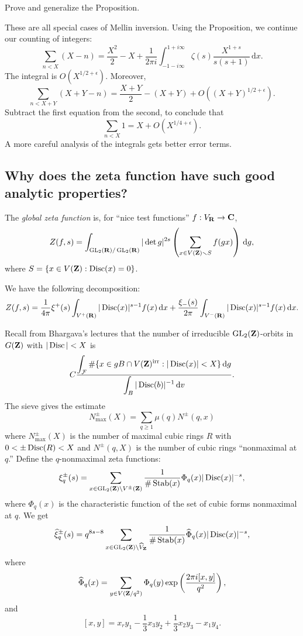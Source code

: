\begin{exercise}
Prove and generalize the Proposition. 
\end{exercise}

These are all special cases of Mellin inversion. Using the Proposition, we 
continue our counting of integers: 
\[
  \sum_{n<X} (X-n) = \frac{X^2}{2} - X + \frac{1}{2\pi i} \int_{-1-i\infty}^{1+i\infty} \zeta(s) \frac{X^{1+s}}{s(s+1)}\, \mathrm{d} x .
\]
The integral is $O(X^{1/2+\epsilon})$. Moreover, 
\[
  \sum_{n<X+Y} (X+Y-n) = \frac{X+Y}{2} - (X+Y) + O((X+Y)^{1/2+\epsilon}) .
\]
Subtract the first equation from the second, to conclude that 
\[
  \sum_{n<X} 1 = X+O(X^{1/4+\epsilon}) .
\]
A more careful analysis of the integrals gets better error terms. 





\subsection{Why does the zeta function have such good analytic properties?}

\begin{defi}[Shintani]
The \emph{global zeta function} is, for ``nice test functions'' 
$f:V_{\mathbf{R}}\to \mathbf{C}$, 
\[
  Z(f,s) = \int_{\operatorname{GL}_2(\mathbf{R})/\operatorname{GL}_2(\mathbf{R})} |\det g|^{2 s} \left(\sum_{x\in V(\mathbf{Z})\smallsetminus S} f(g x)\right)\, \mathrm{d} g ,
\]
where $S=\{x\in V(\mathbf{Z}):\operatorname{Disc}(x)=0\}$. 
\end{defi}

\begin{prop}
We have the following decomposition:
\[
  Z(f,s) = \frac{1}{4\pi} \xi^+(s) \int_{V^+(\mathbf{R})} |\operatorname{Disc}(x)|^{s-1} f(x)\, \mathrm{d}x + \frac{\xi_-(s)}{2\pi} \int_{V^-(\mathbf{R})} |\operatorname{Disc}(x)|^{s-1} f(x)\,\mathrm{d} x .
\]
\end{prop}

Recall from Bhargava's lectures that the number of irreducible 
$\operatorname{GL}_2(\mathbf{Z})$-orbits in $G(\mathbf{Z})$ with $|\operatorname{Disc}|<X$ is 
\[
  C \frac{\displaystyle\int_{\mathcal{F}}\#\{x\in g B\cap V(\mathbf{Z})^\mathrm{irr}:|\operatorname{Disc}(x)|<X\}\,\mathrm{d}g}{\displaystyle\int_B |\operatorname{Disc}(b)|^{-1}\, \mathrm{d} v} .
\]
The sieve gives the estimate 
\[
  N_\mathrm{max}^\pm(X) = \sum_{q\geqslant 1} \mu(q) N^\pm(q,x) 
\]
where $N^\pm_\mathrm{max}(X)$ is the number of maximal cubic rings $R$ with 
$0<\pm \operatorname{Disc}(R)<X$ and 
$N^\pm(q,X)$ is the number of cubic rings ``nonmaximal at $q$.'' Define the 
$q$-nonmaximal zeta functions: 
\[
  \xi_q^\pm(s) = \sum_{x\in \operatorname{GL}_2(\mathbf{Z})\backslash V^\pm(\mathbf{Z})} \frac{1}{\#\operatorname{Stab}(x)} \Phi_q(x) |\operatorname{Disc}(x)|^{-s} ,
\]
where $\Phi_q(x)$ is the characteristic function of the set of cubic forms 
nonmaximal at $q$. We get 
\[
  \widehat\xi_q^\pm(s) = q^{8 s-8} \sum_{x\in \operatorname{GL}_2(\mathbf{Z})\backslash \widehat V_{\mathbf{Z}}} \frac{1}{\#\operatorname{Stab}(x)}\widehat\Phi_q(x) |\operatorname{Disc}(x)|^{-s} ,
\]
where 
\[
  \widehat\Phi_q(x) = \sum_{y\in V(\mathbf{Z}/q^2)} \Phi_q(y) \exp\left(\frac{2\pi i[x,y]}{q^2}\right) ,
\]
and 
\[
  [x,y] = x_r y_1 - \frac 1 3 x_3 y_2 + \frac 1 3 x_2 y_3 - x_1 y_4 .
\]




